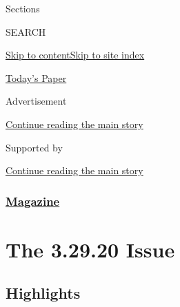 Sections

SEARCH

\protect\hyperlink{site-content}{Skip to
content}\protect\hyperlink{site-index}{Skip to site index}

\href{https://myaccount.nytimes3xbfgragh.onion/auth/login?response_type=cookie\&client_id=vi}{}

\href{https://www.nytimes3xbfgragh.onion/section/todayspaper}{Today's
Paper}

Advertisement

\protect\hyperlink{after-top}{Continue reading the main story}

Supported by

\protect\hyperlink{after-sponsor}{Continue reading the main story}

\hypertarget{magazine}{%
\subsubsection{\texorpdfstring{\href{/section/magazine}{Magazine}}{Magazine}}\label{magazine}}

\hypertarget{the-32920-issue}{%
\section{The 3.29.20 Issue}\label{the-32920-issue}}

\hypertarget{highlights}{%
\subsection{Highlights}\label{highlights}}

